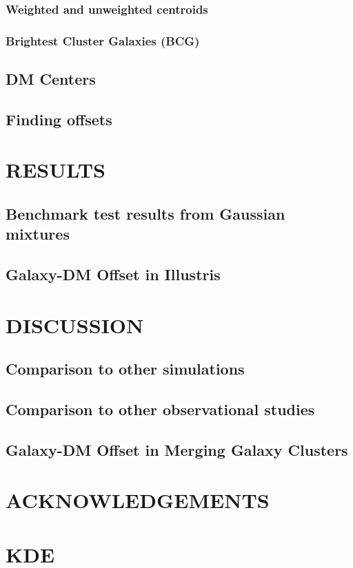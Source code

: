 \documentclass[letterpaper,useAMS,usenatbib]{mn2e}
\begin{document}
\subsubsection{Weighted and unweighted centroids}
\subsubsection{Brightest Cluster Galaxies (BCG)}
\subsection{DM Centers}
\subsection{Finding offsets} 
\section{RESULTS} 
\subsection{Benchmark test results from Gaussian mixtures} 
\subsection{Galaxy-DM Offset in Illustris}
\section{DISCUSSION}
\subsection{Comparison to other simulations}
\subsection{Comparison to other observational studies}
\subsection{Galaxy-DM Offset in Merging Galaxy Clusters}
\section{ACKNOWLEDGEMENTS}



\appendix
\section{KDE}
\clearpage\bsp\label{lastpage} 
\end{document}
